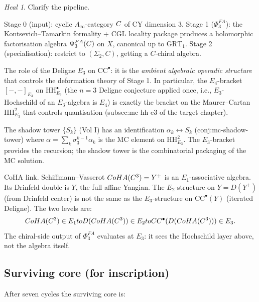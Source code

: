 \documentclass[11pt]{article}
\theoremstyle{definition}
\theoremstyle{remark}
\newtheorem*{heal}{Heal}
\newcommand{\CC}{\mathrm{CC}}
\newcommand{\HH}{\mathrm{HH}}
\newcommand{\Ainf}{A_{\infty}}
\begin{document}
\begin{heal}
Clarify the pipeline.

Stage 0 (input): cyclic $\Ainf$-category $C$ of CY dimension $3$.
Stage 1 ($\Phi^{FA}_3$): the Kontsevich--Tamarkin formality + CGL
locality package produces a holomorphic factorisation algebra
$\Phi^{FA}_3(C)$ on $X$, canonical up to $\mathrm{GRT}_1$.
Stage 2 (specialisation): restrict to $(\Sigma_2, C)$, getting a
$C$-chiral algebra.

The role of the Deligne $E_3$ on $\CC^\bullet$: it is the
\emph{ambient algebraic operadic structure} that controls the
deformation theory of Stage 1. In particular, the $E_4$-bracket
$[-,-]_{E_3}$ on $\HH^\bullet_{E_3}$ (the $n=3$ Deligne conjecture
applied once, i.e., $E_3$-Hochschild of an $E_3$-algebra is $E_4$)
is exactly the bracket on the Maurer--Cartan $\HH^2_{E_3}$ that
controls quantisation (subsec:mc-hh-e3 of the target chapter).

The shadow tower $\{S_k\}$ (Vol I) has an identification
$\alpha_k \longleftrightarrow S_k$ (conj:mc-shadow-tower) where
$\alpha = \sum_k \sigma_3^{k-1} \alpha_k$ is the MC element on
$\HH^2_{E_3}$. The $E_3$-bracket provides the recursion; the shadow
tower is the combinatorial packaging of the MC solution.

CoHA link. Schiffmann--Vasserot $CoHA(C^3) = Y^+$ is an
$E_1$-associative algebra. Its Drinfeld double is $Y$, the full
affine Yangian. The $E_2$-structure on $Y = D(Y^+)$ (from Drinfeld
center) is not the same as the $E_3$-structure on $\CC^\bullet(Y)$
(iterated Deligne). The two levels are:
\[
 \mathrm{CoHA}(\C^3) \in E_1 \to
 D(\mathrm{CoHA}(\C^3)) \in E_2 \to
 \CC^\bullet(D(\mathrm{CoHA}(\C^3))) \in E_3.
\]
The chiral-side output of $\Phi_3^{FA}$ evaluates at $E_3$: it sees
the Hochschild layer above, not the algebra itself.
\end{heal}

\subsection*{Surviving core (for inscription)}

After seven cycles the surviving core is:
\end{document}
